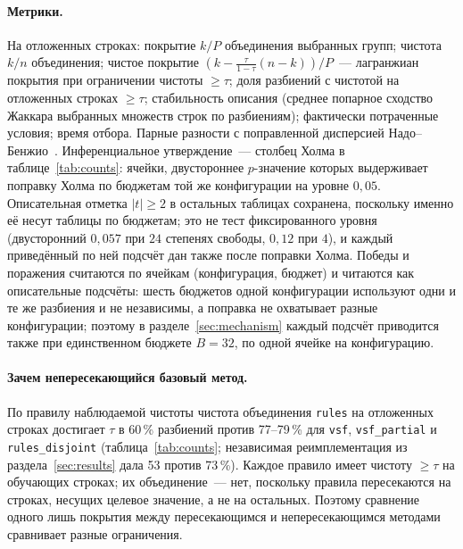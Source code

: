 \documentclass[11pt]{article}
\begin{document}
\paragraph{Метрики.} На отложенных строках: покрытие $k/P$ объединения выбранных групп; чистота $k/n$ объединения; чистое покрытие $(k-\frac{\tau}{1-\tau}(n-k))/P$~--- лагранжиан покрытия при ограничении чистоты $\ge\tau$; доля разбиений с чистотой на отложенных строках $\ge\tau$; стабильность описания (среднее попарное сходство Жаккара выбранных множеств строк по разбиениям); фактически потраченные условия; время отбора. Парные разности с поправленной дисперсией Надо--Бенжио~\citep{nadeau2003}. Инференциальное утверждение~--- столбец Холма в таблице~\ref{tab:counts}: ячейки, двустороннее $p$-значение которых выдерживает поправку Холма по бюджетам той же конфигурации на уровне $0{,}05$. Описательная отметка $|t|\ge2$ в остальных таблицах сохранена, поскольку именно её несут таблицы по бюджетам; это не тест фиксированного уровня (двусторонний $0{,}057$ при $24$ степенях свободы, $0{,}12$ при $4$), и каждый приведённый по ней подсчёт дан также после поправки Холма. Победы и поражения считаются по ячейкам (конфигурация, бюджет) и читаются как описательные подсчёты: шесть бюджетов одной конфигурации используют одни и те же разбиения и не независимы, а поправка не охватывает разные конфигурации; поэтому в разделе~\ref{sec:mechanism} каждый подсчёт приводится также при единственном бюджете $B=32$, по одной ячейке на конфигурацию.

\paragraph{Зачем непересекающийся базовый метод.} По правилу наблюдаемой чистоты чистота объединения \texttt{rules} на отложенных строках достигает $\tau$ в 60\,\% разбиений против 77--79\,\% для \texttt{vsf}, \texttt{vsf\_partial} и \texttt{rules\_disjoint} (таблица~\ref{tab:counts}; независимая реимплементация из раздела~\ref{sec:results} дала 53 против 73\,\%). Каждое правило имеет чистоту $\ge\tau$ на обучающих строках; их объединение~--- нет, поскольку правила пересекаются на строках, несущих целевое значение, а не на остальных. Поэтому сравнение одного лишь покрытия между пересекающимся и непересекающимся методами сравнивает разные ограничения.
\end{document}
